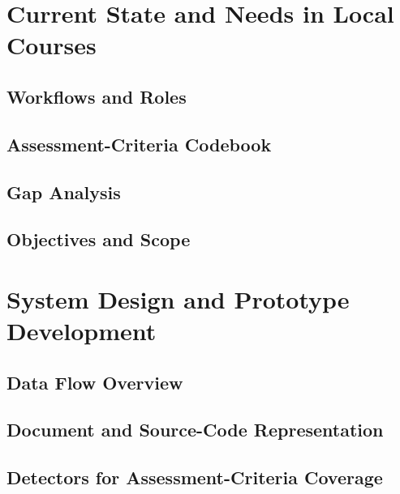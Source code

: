 \chapter{Current State and Needs in Local Courses}\label{ch:local-state}

\section{Workflows and Roles}\label{sec:workflows}

\section{Assessment-Criteria Codebook}\label{sec:codebook}

\section{Gap Analysis}\label{sec:gap-analysis}

\section{Objectives and Scope}\label{sec:objectives}


\chapter{System Design and Prototype Development}\label{ch:design}

\section{Data Flow Overview}\label{sec:dataflow}

\section{Document and Source-Code Representation}\label{sec:representation}

\section{Detectors for Assessment-Criteria Coverage}\label{sec:detectors}
